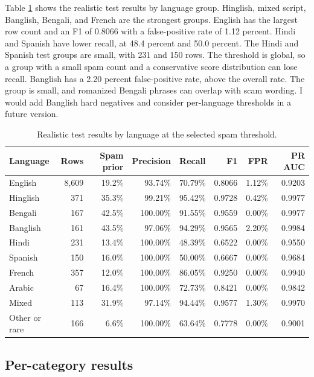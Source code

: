 \documentclass[11pt]{article}
\begin{document}
Table \ref{tab:language} shows the realistic test results by language group. Hinglish, mixed script, Banglish, Bengali, and French are the strongest groups. English has the largest row count and an F1 of 0.8066 with a false-positive rate of 1.12 percent. Hindi and Spanish have lower recall, at 48.4 percent and 50.0 percent. The Hindi and Spanish test groups are small, with 231 and 150 rows. The threshold is global, so a group with a small spam count and a conservative score distribution can lose recall. Banglish has a 2.20 percent false-positive rate, above the overall rate. The group is small, and romanized Bengali phrases can overlap with scam wording. I would add Banglish hard negatives and consider per-language thresholds in a future version.

\begin{table}[htbp]
\centering
\small
\caption{Realistic test results by language at the selected spam threshold.}
\label{tab:language}
\begin{tabularx}{\textwidth}{Xrrrrrrr}
\toprule
Language & Rows & Spam prior & Precision & Recall & F1 & FPR & PR AUC \\
\midrule
English & 8,609 & 19.2\% & 93.74\% & 70.79\% & 0.8066 & 1.12\% & 0.9203 \\
Hinglish & 371 & 35.3\% & 99.21\% & 95.42\% & 0.9728 & 0.42\% & 0.9977 \\
Bengali & 167 & 42.5\% & 100.00\% & 91.55\% & 0.9559 & 0.00\% & 0.9977 \\
Banglish & 161 & 43.5\% & 97.06\% & 94.29\% & 0.9565 & 2.20\% & 0.9984 \\
Hindi & 231 & 13.4\% & 100.00\% & 48.39\% & 0.6522 & 0.00\% & 0.9550 \\
Spanish & 150 & 16.0\% & 100.00\% & 50.00\% & 0.6667 & 0.00\% & 0.9684 \\
French & 357 & 12.0\% & 100.00\% & 86.05\% & 0.9250 & 0.00\% & 0.9940 \\
Arabic & 67 & 16.4\% & 100.00\% & 72.73\% & 0.8421 & 0.00\% & 0.9842 \\
Mixed & 113 & 31.9\% & 97.14\% & 94.44\% & 0.9577 & 1.30\% & 0.9970 \\
Other or rare & 166 & 6.6\% & 100.00\% & 63.64\% & 0.7778 & 0.00\% & 0.9001 \\
\bottomrule
\end{tabularx}
\end{table}

\subsection{Per-category results}
\end{document}
